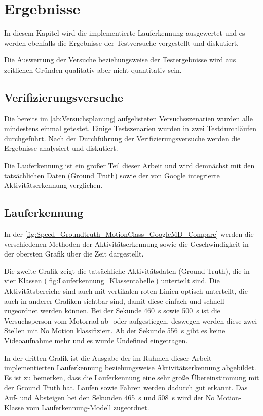 \chapter{Ergebnisse}

In diesem Kapitel wird die implementierte Lauferkennung ausgewertet und es werden ebenfalls die Ergebnisse der Testversuche vorgestellt und diskutiert.

Die Auswertung der Versuche beziehungsweise der Testergebnisse wird aus zeitlichen Gründen qualitativ aber nicht quantitativ sein.


\section{Verifizierungsversuche}

Die bereits im \autoref{ab:Versuchsplanung} aufgelisteten Versuchsszenarien wurden alle mindestens einmal getestet. Einige Testszenarien wurden in zwei Testdurchläufen durchgeführt.
Nach der Durchführung der Verifizierungsversuche werden die Ergebnisse analysiert und diskutiert. 

Die Lauferkennung ist ein großer Teil dieser Arbeit und wird demnächst mit den tatsächlichen Daten (Ground Truth) sowie der von Google integrierte Aktivitäts\-erkennung verglichen.
\section{Lauferkennung}

In der \autoref{fig:Speed_Groundtruth_MotionClass_GoogleMD_Compare} werden die verschiedenen Methoden der Aktivitätserkennung sowie die Geschwindigkeit in der obersten Grafik über die Zeit dargestellt.

Die zweite Grafik zeigt die tatsächliche Aktivitätsdaten (Ground Truth), die in vier Klassen (\autoref{fig:Lauferkennung_Klassentabelle}) unterteilt sind. Die Aktivitätsbereiche sind auch mit vertikalen roten Linien optisch unterteilt, die auch in anderer Grafiken sichtbar sind, damit diese einfach und schnell zugeordnet werden können. Bei der Sekunde \SI{460}{\second} sowie \SI{500}{\second} ist die Versuchsperson vom Motorrad ab- oder aufgestiegen, deswegen werden diese zwei Stellen mit \glqq No Motion\grqq{} klassifiziert. Ab der Sekunde \SI{556}{\second} gibt es keine Videoaufnahme mehr und es wurde \glqq Undefined\grqq{} eingetragen.

In der dritten Grafik ist die Ausgabe der im Rahmen dieser Arbeit implementierten Lauferkennung beziehungsweise Aktivitätserkennung abgebildet. 
Es ist zu bemerken, dass die Lauferkennung eine sehr große Übereinstimmung mit der Ground Truth hat. Laufen sowie Fahren werden dadurch gut erkannt. Das Auf- und Absteigen bei den Sekunden \SI{465}{\second} und \SI{508}{\second} wird der \glqq No Motion\grqq{}-Klasse vom Lauferkennung-Modell zugeordnet.

